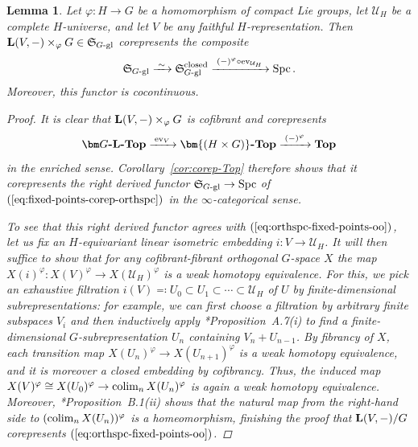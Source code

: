 \documentclass[reqno]{memo-l}
\theoremstyle{mythm}
\newtheorem{lemma}[thm]{Lemma}
\theoremstyle{definition}
\numberwithin{equation}{section}
\newcommand{\Uu}{{\mathcal{U}}}
\DeclareMathOperator{\ev}{ev}
\renewcommand{\phi}{\varphi}
\DeclareMathOperator{\Spc}{Spc}
\newcommand{\cat}[1]{\textbf{\textup{#1}}}
\newcommand{\colim}{\mathop{\textup{colim}}}
\newcommand{\iso}{\xrightarrow{\;\smash{\raisebox{-0.25ex}{\ensuremath{\scriptstyle\sim}}}\;}}
\newcommand{\myS}{{{\mathfrak S\kern-.4pt}}}
\begin{document}
\begin{lemma}\label{lemma:fixed-point-corep}
    Let $\phi\colon H\to G$ be a homomorphism of compact Lie groups, let $\Uu_H$ be a complete $H$-universe, and let $V$ be any faithful $H$-representation. Then $\cat{L}(V,-)\times_\phi G\in\myS_\textup{$G$-gl}$ corepresents the composite
    \begin{equation}\label{eq:orthspc-fixed-points-oo}
        \myS_\textup{$G$-gl}\iso\myS_\textup{$G$-gl}^\textup{closed}\xrightarrow{\;(-)^\phi\circ\ev_{\Uu_H}\;}\Spc.
    \end{equation}
    Moreover, this functor is cocontinuous.
    \begin{proof}
        It is clear that $\cat{L}(V,-)\times_\phi G$ is cofibrant and corepresents
        \begin{equation}\label{eq:fixed-points-corep-orthspc}
            \cat{$\bm G$-$\cat{L}$-Top}\xrightarrow{\;\ev_V\;}\cat{$\bm{(H\times G)}$-Top}\xrightarrow{\;(-)^\phi\;}\cat{Top}
        \end{equation}
        in the enriched sense. Corollary~\ref{cor:corep-Top} therefore shows that it corepresents the right derived functor $\myS_\text{$G$-gl}\to\Spc$ of $(\ref{eq:fixed-points-corep-orthspc})$ in the $\infty$-categorical sense.
      
        To see that this right derived functor agrees with $(\ref{eq:orthspc-fixed-points-oo})$, let us fix an $H$-equivariant linear isometric embedding $i\colon V\to\Uu_H$. It will then suffice to show that for any cofibrant-fibrant orthogonal $G$-space $X$ the map $X(i)^\phi\colon X(V)^\phi\to X(\Uu_H)^\phi$ is a weak homotopy equivalence. For this, we pick an exhaustive filtration $i(V)\eqqcolon U_0\subset U_1\subset\cdots\subset\Uu_H$ of $U$ by finite-dimensional subrepresentations: for example, we can first choose a filtration by arbitrary finite subspaces $V_i$ and then inductively apply \cite{schwede_orbispaces_2020}*{Proposition~A.7(i)} to find a finite-dimensional $G$-subrepresentation $U_n$ containing $V_n+U_{n-1}$. By fibrancy of $X$, each transition map $X(U_n)^\phi\to X(U_{n+1})^\phi$ is a weak homotopy equivalence, and it is moreover a closed embedding by cofibrancy. Thus, the induced map $X(V)^\phi\cong X(U_0)^\phi\to \colim_n X(U_n)^\phi$ is again a weak homotopy equivalence. Moreover, \cite{schwede2018global}*{Proposition~B.1(ii)} shows that the natural map from the right-hand side to $(\colim_n X(U_n))^\phi$ is a homeomorphism, finishing the proof that $\cat{L}(V,-)/G$ corepresents $(\ref{eq:orthspc-fixed-points-oo})$.


\end{proof}
\end{lemma}
\end{document}
